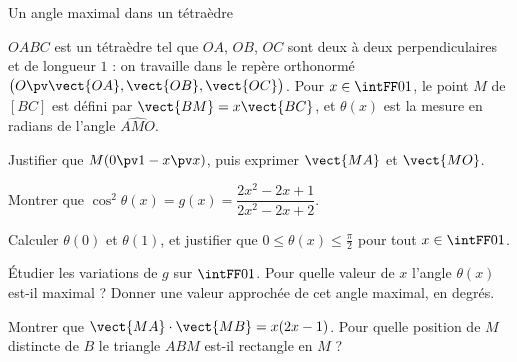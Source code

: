 \begin{exercice}[3]{Un angle maximal dans un tétraèdre}
\begin{codecote}[0.62]
$OABC$ est un tétraèdre tel que $OA$, $OB$, $OC$ sont deux à deux perpendiculaires et de longueur $1$ : on travaille dans le repère
orthonormé $\big(O\pv\vect{OA},\vect{OB},\vect{OC}\big)$. Pour $x\in\intFF01$, le point $M$ de $[BC]$ est défini par
$\vect{BM}=x\vect{BC}$, et $\theta(x)$ est la mesure en radians de l'angle $\widehat{AMO}$.
\begin{questions}
  \item Justifier que $M(0\pv1-x\pv x)$, puis exprimer $\vect{MA}$ et $\vect{MO}$.
  \item Montrer que $\cos^2\theta(x)=g(x)=\dfrac{2x^2-2x+1}{2x^2-2x+2}$.
\end{questions}
\cote
\centering
{}
\end{codecote}
\begin{questions}[start=3]
  \item Calculer $\theta(0)$ et $\theta(1)$, et justifier que $0\leq\theta(x)\leq\frac{\pi}{2}$ pour tout $x\in\intFF01$.
  \item Étudier les variations de $g$ sur $\intFF01$. Pour quelle valeur de $x$ l'angle $\theta(x)$ est-il maximal ? Donner une valeur
    approchée de cet angle maximal, en degrés.
  \item Montrer que $\vect{MA}\cdot\vect{MB}=x(2x-1)$. Pour quelle position de $M$ distincte de $B$ le triangle $ABM$ est-il rectangle en $M$ ?
\end{questions}
\end{exercice}

